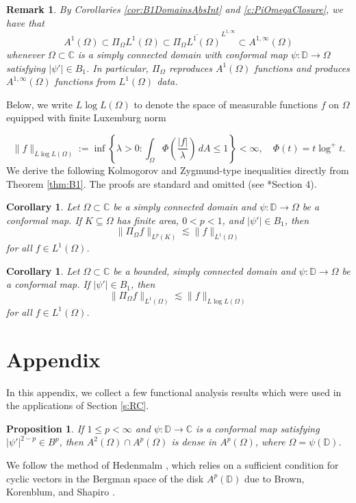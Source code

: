\documentclass{amsart}
\newtheorem{corollary}[theorem]{Corollary}
\newtheorem{proposition}[theorem]{Proposition}
\newtheorem{remark}[theorem]{Remark}
\theoremstyle{definition}
\numberwithin{equation}{section}
\begin{document}
\begin{remark}
    By Corollaries \ref{cor:B1DomainsAbsInt} and \ref{c:PiOmegaClosure}, we have that 
    $$
        A^1(\Omega) \subset \Pi_{\Omega} L^1(\Omega) \subset \overline{\Pi_\Omega L^1(\Omega)}^{L^{1,\infty}} \subset A^{1,\infty}(\Omega)
    $$
    whenever $\Omega\subset \mathbb{C}$ is a simply connected domain 
    with conformal map $\psi\colon \mathbb{D}\rightarrow\Omega$ satisfying $|\psi'| \in B_1$. In particular, $\Pi_{\Omega}$ reproduces $A^1(\Omega)$ functions and produces $A^{1,\infty}(\Omega)$ functions from $L^1(\Omega)$ data. 
\end{remark}

Below, we write $L \log L(\Omega)$ to denote the space of measurable functions $f$ on $\Omega$ equipped with finite Luxemburg norm

$$ \|f\|_{L \log L(\Omega)}:= \inf\left\{\lambda>0: \int_{\Omega} \Phi\left(\dfrac{|f|}{\lambda}\right) \, dA \leq 1 \right \}< \infty, \quad \Phi(t)=t \log^{+}t.$$ We derive the following Kolmogorov and Zygmund-type inequalities directly from Theorem \ref{thm:B1}. The proofs are standard and omitted (see \cite{SW22}*{Section 4}).
\begin{corollary}\label{cor:Kolmogorov}
Let $\Omega \subset \mathbb C$ be a simply connected domain and $\psi\colon \mathbb D \to \Omega$ be a conformal map. If $K \subseteq \Omega$ has finite area, $0<p<1$, and $|\psi'|\in B_1$, then 
$$ \|\Pi_{\Omega}f \|_{L^p(K)} \lesssim \|f\|_{L^{1}(\Omega)}$$
for all $f \in L^1(\Omega)$. 
\end{corollary}

\begin{corollary}\label{cor:Zygmund}
Let $\Omega \subset \mathbb C$ be a bounded, simply connected domain and $\psi\colon \mathbb D \to \Omega$ be a conformal map. If $|\psi'|\in B_1$, then 
$$ \|\Pi_{\Omega}f \|_{L^1(\Omega)} \lesssim \|f\|_{L \log L(\Omega)}$$
for all $f \in L^1(\Omega)$. 
\end{corollary}


\section{Appendix}\label{s:appendix}
In this appendix, we collect a few functional analysis results which were used in the applications of Section \ref{s:RC}.
\begin{proposition}\label{p:density}
    If $1 \le p < \infty$ and $\psi: \mathbb D \to \mathbb C$ is a conformal map satisfying $|\psi'|^{2-p} \in B^p$, then $A^2(\Omega) \cap A^p(\Omega)$ is dense in $A^p(\Omega)$, where $\Omega = \psi(\mathbb D)$. 
\end{proposition}
We follow the method of Hedenmalm \cite{Hed02}, which relies on a sufficient condition for cyclic vectors in the Bergman space of the disk $A^p(\mathbb D)$ due to Brown, Korenblum, and Shapiro \cites{BK88,Sha67}.
\end{document}
